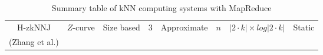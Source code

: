 \begin{table*}[htp]
\begin{tabular}{ | c | c | c | c | c | c | c | c | }
    H-zkNNJ \cite{Zhang:2012:EPK:2247596.2247602} & $Z$-curve & Size based & 3 & Approximate & $n$ & $\left|2 \cdot k\right| \times log\left|2 \cdot k\right|$ & Static \\ 
    (Zhang et al.) & & & & & & &\\ \hline
    
    
    
%    
%    
    
  \end{tabular}
  
\caption{Summary table of kNN computing systems with MapReduce}\label{summary_table} 
\end{table*}